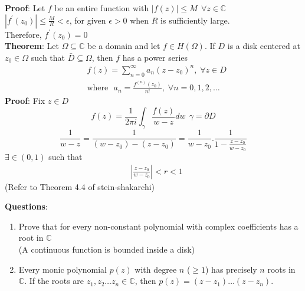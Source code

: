 \documentclass{article}
\begin{document}
\begin{flushleft}
\textbf{Proof}: Let $f$ be an entire function with $|f(z)|\leq M \:\:\forall z\in\mathds{C}$\\
$|f^{'}(z_0)|\leq \frac{M}{R} < \epsilon$, for given $\epsilon>0$ when $R$ is sufficiently large.\\
Therefore, $f^{'}(z_0)=0$\\
\textbf{Theorem}: Let $\Omega\subseteq \mathds{C}$ be a domain and let $f\in H(\Omega)$. If $D$ is a disk centered at $z_0\in \Omega$ such that $\bar{D}\subseteq \Omega$, then $f$ has a power series\\
\begin{equation*}
    \begin{split}
        &f(z)=\sum_{n=0}^{\infty} a_n(z-z_0)^n\text{,}\:\: \forall z\in D\\
        &\text{where}\:\:\: a_n=\frac{f^{(n)}(z_0)}{n!}\text{,} \:\: \forall n=0,1,2,\dots
    \end{split}
\end{equation*}
\textbf{Proof}:  Fix $z\in D$\\
\begin{equation*}
 f(z)=\frac{1}{2\pi i}\int_{\gamma}^{}\frac{f(z)}{w-z} dw \:\: \gamma=\partial D
\end{equation*}
\begin{equation*}
    \frac{1}{w-z}=\frac{1}{(w-z_0)-(z-z_0)}=\frac{1}{w-z_0}.\frac{1}{1-\frac{z-z_0}{w-z_0}}
\end{equation*}
$\exists\in (0,1)$ such that \\
\begin{equation*}
    \begin{split}
        &|\frac{z-z_0}{w-z_0}|<r<1
    \end{split}
\end{equation*}
(Refer to Theorem 4.4 of stein-shakarchi)
\clearpage

\textbf{Questions}:
\begin{enumerate}
\item Prove that for every non-constant polynomial with complex coefficients has a root in $\mathds{C}$ \\(A continuous function is bounded inside a disk)\\
\item Every monic polynomial $p(z)$ with degree $n$ ($\geq 1$) has precisely $n$ roots in $\mathds{C}$. If the roots are $z_1,z_2\dots z_n \in \mathds{C}$, then $p(z)= (z-z_1)\dots(z-z_n)$.\\
\end{enumerate}

\end{flushleft}
\end{document}

